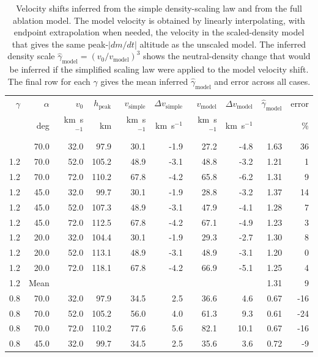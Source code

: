 \begin{table}
\caption{Velocity shifts inferred from the simple density-scaling law and from the full ablation model. The model velocity is obtained by linearly interpolating, with endpoint extrapolation when needed, the velocity in the scaled-density model that gives the same peak-$|dm/dt|$ altitude as the unscaled model. The inferred density scale $\hat{\gamma}_{\mathrm{model}}=(v_0/v_{\mathrm{model}})^3$ shows the neutral-density change that would be inferred if the simplified scaling law were applied to the model velocity shift. The final row for each $\gamma$ gives the mean inferred $\hat{\gamma}_{\mathrm{model}}$ and error across all cases.}
\label{tab:velocity-shift}
\begin{tabular}{rrrrrrrrrr}
\tophline
$\gamma$ & $\alpha$ & $v_0$ & $h_{\mathrm{peak}}$ & $v_{\mathrm{simple}}$ & $\Delta v_{\mathrm{simple}}$ & $v_{\mathrm{model}}$ & $\Delta v_{\mathrm{model}}$ & $\hat{\gamma}_{\mathrm{model}}$ & error \\
 & deg & km~s$^{-1}$ & km & km~s$^{-1}$ & km~s$^{-1}$ & km~s$^{-1}$ & km~s$^{-1}$ &  & \% \\
\middlehline
1.2 & 70.0 & 32.0 & 97.9 & 30.1 & -1.9 & 27.2 & -4.8 & 1.63 & 36 \\
1.2 & 70.0 & 52.0 & 105.2 & 48.9 & -3.1 & 48.8 & -3.2 & 1.21 & 1 \\
1.2 & 70.0 & 72.0 & 110.2 & 67.8 & -4.2 & 65.8 & -6.2 & 1.31 & 9 \\
1.2 & 45.0 & 32.0 & 99.7 & 30.1 & -1.9 & 28.8 & -3.2 & 1.37 & 14 \\
1.2 & 45.0 & 52.0 & 107.3 & 48.9 & -3.1 & 47.9 & -4.1 & 1.28 & 7 \\
1.2 & 45.0 & 72.0 & 112.5 & 67.8 & -4.2 & 67.1 & -4.9 & 1.23 & 3 \\
1.2 & 20.0 & 32.0 & 104.4 & 30.1 & -1.9 & 29.3 & -2.7 & 1.30 & 8 \\
1.2 & 20.0 & 52.0 & 113.1 & 48.9 & -3.1 & 48.9 & -3.1 & 1.20 & 0 \\
1.2 & 20.0 & 72.0 & 118.1 & 67.8 & -4.2 & 66.9 & -5.1 & 1.25 & 4 \\
1.2 & Mean & & & & & & & 1.31 & 9 \\
0.8 & 70.0 & 32.0 & 97.9 & 34.5 & 2.5 & 36.6 & 4.6 & 0.67 & -16 \\
0.8 & 70.0 & 52.0 & 105.2 & 56.0 & 4.0 & 61.3 & 9.3 & 0.61 & -24 \\
0.8 & 70.0 & 72.0 & 110.2 & 77.6 & 5.6 & 82.1 & 10.1 & 0.67 & -16 \\
0.8 & 45.0 & 32.0 & 99.7 & 34.5 & 2.5 & 35.6 & 3.6 & 0.72 & -9 \\

\end{tabular}
\end{table}
